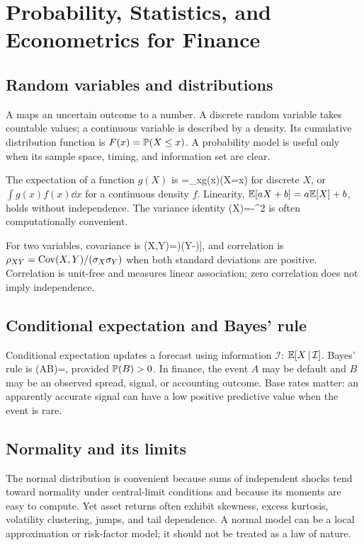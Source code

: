 \chapter{Probability, Statistics, and Econometrics for Finance}

\section{Random variables and distributions}
A  maps an uncertain outcome to a number. A discrete random variable takes countable values; a continuous variable is described by a density. Its cumulative distribution function is $F(x)=\mathbb{P}(X\leq x)$. A probability model is useful only when its sample space, timing, and information set are clear.

The expectation of a function $g(X)$ is
  \E[g(X)]=\sum_xg(x)\Prob(X=x)
\closeformula
for discrete $X$, or $\int g(x)f(x)\dd x$ for a continuous density $f$. Linearity, $\mathbb{E}[aX+b]=a\mathbb{E}[X]+b$, holds without independence. The variance identity
  \Var(X)=\E[X^2]-\E[X]^2
\closeformula
is often computationally convenient.

For two variables, covariance is
  \Cov(X,Y)=\E[(X-\E[X])(Y-\E[Y])],
\closeformula
and correlation is $\rho_{XY}=\operatorname{Cov}(X,Y)/(\sigma_X\sigma_Y)$ when both standard deviations are positive. Correlation is unit-free and measures linear association; zero correlation does not imply independence.

\section{Conditional expectation and Bayes' rule}
Conditional expectation updates a forecast using information $\mathcal{I}$: $\mathbb{E}[X\,|\,\mathcal{I}]$. Bayes' rule is
  \Prob(A\given B)=,
\closeformula
provided $\mathbb{P}(B)>0$. In finance, the event $A$ may be default and $B$ may be an observed spread, signal, or accounting outcome. Base rates matter: an apparently accurate signal can have a low positive predictive value when the event is rare.

\section{Normality and its limits}
The normal distribution is convenient because sums of independent shocks tend toward normality under central-limit conditions and because its moments are easy to compute. Yet asset returns often exhibit skewness, excess kurtosis, volatility clustering, jumps, and tail dependence. A normal model can be a local approximation or risk-factor model; it should not be treated as a law of nature.

